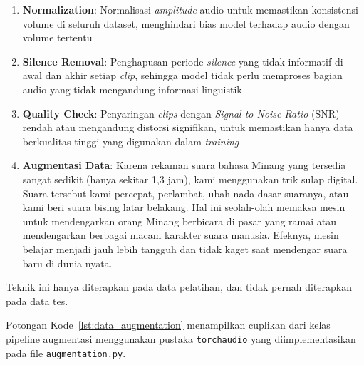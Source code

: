 \begin{enumerate}[noitemsep]
    \item \textbf{Normalization}: Normalisasi \textit{amplitude} audio untuk memastikan konsistensi volume di seluruh dataset, menghindari bias model terhadap audio dengan volume tertentu
    \item \textbf{Silence Removal}: Penghapusan periode \textit{silence} yang tidak informatif di awal dan akhir setiap \textit{clip}, sehingga model tidak perlu memproses bagian audio yang tidak mengandung informasi linguistik
    \item \textbf{Quality Check}: Penyaringan \textit{clips} dengan \textit{Signal-to-Noise Ratio} (SNR) rendah atau mengandung distorsi signifikan, untuk memastikan hanya data berkualitas tinggi yang digunakan dalam \textit{training}
    \item \textbf{Augmentasi Data}: Karena rekaman suara bahasa Minang yang tersedia sangat sedikit (hanya sekitar 1,3 jam), kami menggunakan trik sulap digital. Suara tersebut kami percepat, perlambat, ubah nada dasar suaranya, atau kami beri suara bising latar belakang. Hal ini seolah-olah memaksa mesin untuk mendengarkan orang Minang berbicara di pasar yang ramai atau mendengarkan berbagai macam karakter suara manusia. Efeknya, mesin belajar menjadi jauh lebih tangguh dan tidak kaget saat mendengar suara baru di dunia nyata.
\end{enumerate}

\vspace{0.3cm}
\noindent
Teknik ini hanya diterapkan pada data pelatihan, dan tidak pernah diterapkan pada data tes.

Potongan Kode~\ref{lst:data_augmentation} menampilkan cuplikan dari kelas pipeline augmentasi menggunakan pustaka \texttt{torchaudio} yang diimplementasikan pada file \texttt{augmentation.py}.

